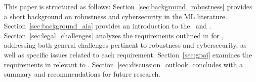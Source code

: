 This paper is structured as follows: Section~\ref{sec:background_robustness} provides a short background on robustness and cybersecurity in the ML literature.
%
Section~\ref{sec:background_aia} provides an introduction to the \EUAIAct\ and .
%
Section~\ref{sec:legal_challenges} analyzes the requirements outlined in  for \HRAIS, addressing both general challenges pertinent to robustness and cybersecurity, as well as specific issues related to each requirement. 
%  
Section~\ref{sec:gpai} examines the requirements in  relevant to \GPAIMSSR. 
%
Section~\ref{sec:discussion_outlook} concludes with a summary and recommendations for future research.
